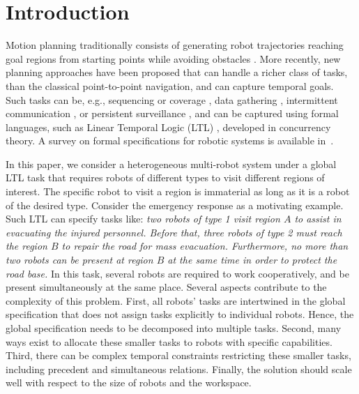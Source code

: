\documentclass[Afour,sageh,times]{sagej}
\begin{document}
\maketitle
\section{Introduction}

{M}{otion} planning traditionally consists of generating robot trajectories reaching goal regions from starting points while avoiding obstacles \citep{lavalle2006planning}. More recently, {new planning approaches have been proposed that} can handle a richer class of tasks, than the classical point-to-point navigation, and can capture temporal goals. Such tasks can be, e.g., sequencing or coverage \citep{fainekos2005temporal}, data gathering \citep{guo2017distributed}, intermittent communication \citep{kantaros2018distributed}, or persistent surveillance \citep{leahy2016persistent}, and can be captured using formal languages, such as Linear Temporal Logic (LTL) \citep{baier2008principles},  developed in concurrency theory. A survey on formal specifications for robotic systems is available in~\cite{luckcuck2019formal}.

In this paper, we consider a heterogeneous multi-robot system under a global LTL task that requires robots of different types to visit different regions of interest. The specific robot to visit a region is immaterial as long as it is a robot of the desired type. Consider the emergency response as a motivating example. Such LTL can specify tasks like: {\it two robots of type 1 visit region $ A $ to assist in evacuating the injured personnel. Before that, three robots of type 2 must reach the region $ B $ to repair the road for mass evacuation. Furthermore,  no more than two robots  can be present at region $B$ at the same time in order to protect the road base.} In this task, several robots are required to work cooperatively, and be present simultaneously at the same place. Several aspects contribute to the complexity of this problem. First, all robots' tasks are intertwined in the global specification that does not assign tasks explicitly to individual robots. Hence, the global specification needs to be decomposed into multiple tasks. Second,  many ways exist to allocate these smaller tasks to robots with specific capabilities. Third, there can be complex temporal constraints restricting these smaller tasks, including precedent and simultaneous relations. Finally, the solution should scale well with respect to the size of robots and the workspace.
\end{document}
